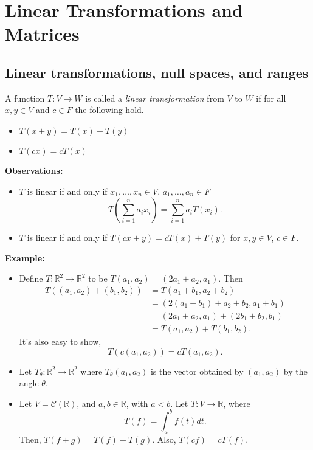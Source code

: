 \documentclass[12pt]{article}
\newenvironment{definition}[2][Definition]{\begin{trivlist}
\item[\hskip \labelsep {\bfseries #1}\hskip \labelsep {\bfseries #2}]}{\end{trivlist}}
\begin{document}
\section{Linear Transformations and Matrices}

\subsection{Linear transformations, null spaces, and ranges}

\begin{definition}{1}
A function $T : V \to W$ is called a \textit{linear transformation} from $V$ to $W$ if for all $x,y \in V$ and $c \in F$ the following hold.

\begin{itemize}
    \item $T(x + y) = T(x) + T(y)$
    \item $T(cx) = cT(x)$
\end{itemize}
\end{definition}

\noindent \textbf{Observations:}
\begin{itemize}
    \item $T$ is linear if and only if $x_1, \dots, x_n \in V$, $a_1, \dots, a_n \in F$ $$T \left( \sum_{i = 1}^n a_ix_i \right) = \sum_{i = 1}^n a_iT(x_i).$$
    \item $T$ is linear if and only if $T(cx + y) = cT(x) + T(y)$ for $x,y \in V$, $c \in F$.
\end{itemize}

\noindent\textbf{Example:} 
\begin{itemize}
    \item[(1)] Define $T : \mathbb{R}^2 \to \mathbb{R}^2$ to be $T(a_1, a_2) = (2a_1 + a_2, a_1)$. Then \begin{align*}
    T((a_1,a_2) + (b_1, b_2)) &= T(a_1 + b_1, a_2 + b_2) \\
    &= (2(a_1 + b_1) + a_2 + b_2, a_1 + b_1) \\
    &= (2a_1 + a_2, a_1) + (2b_1 + b_2, b_1) \\
    &= T(a_1,a_2) + T(b_1,b_2).
    \end{align*}
    It's also easy to show, $$T(c(a_1,a_2)) = cT(a_1,a_2).$$
    
    \item[(2)] Let $T_\theta : \mathbb{R}^2 \to \mathbb{R}^2$ where $T_\theta(a_1,a_2)$ is the vector obtained by $(a_1,a_2)$ by the angle $\theta$.
    
    \item[(3)] Let $V = \mathcal{C}(\mathbb{R})$, and $a, b \in \mathbb{R}$, with $a < b$. Let $T : V \to \mathbb{R}$, where $$T(f) = \int_a^bf(t)dt.$$ Then, $T(f + g) = T(f) + T(g)$. Also, $T(cf) = cT(f)$.
\end{itemize}
\end{document}
